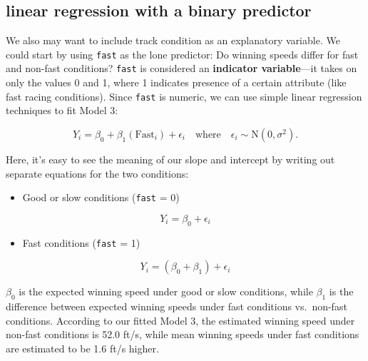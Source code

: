 \documentclass[
]{krantz}
\providecommand{\tightlist}{%
  \setlength{\itemsep}{0pt}\setlength{\parskip}{0pt}}
\begin{document}
\hypertarget{linear-regression-with-a-binary-predictor}{%
\subsection{linear regression with a binary predictor}\label{linear-regression-with-a-binary-predictor}}

We also may want to include track condition as an explanatory variable. We could start by using \texttt{fast} as the lone predictor: Do winning speeds differ for fast and non-fast conditions? \texttt{fast} is considered an \textbf{indicator variable}---it takes on only the values 0 and 1, where 1 indicates presence of a certain attribute (like fast racing conditions). Since \texttt{fast} is numeric, we can use simple linear regression techniques to fit Model 3:

\begin{equation}
Y_{i}=\beta_{0}+\beta_{1}(\textrm{Fast}_{i})+\epsilon_{i}\quad \textrm{where}\quad \epsilon_{i}\sim \textrm{N}(0,\sigma^2).
\label{eq:model3}
\end{equation}

Here, it's easy to see the meaning of our slope and intercept by writing out separate equations for the two conditions:

\begin{itemize}
\tightlist
\item
  Good or slow conditions (\texttt{fast} = 0)
\end{itemize}

\begin{equation}
Y_{i} = \beta_{0}+\epsilon_{i}
\end{equation}

\begin{itemize}
\tightlist
\item
  Fast conditions (\texttt{fast} = 1)
\end{itemize}

\begin{equation}
Y_{i} = (\beta_{0}+\beta_{1})+\epsilon_{i}
\end{equation}

\(\beta_{0}\) is the expected winning speed under good or slow conditions, while \(\beta_{1}\) is the difference between expected winning speeds under fast conditions vs.~non-fast conditions. According to our fitted Model 3, the estimated winning speed under non-fast conditions is 52.0 ft/s, while mean winning speeds under fast conditions are estimated to be 1.6 ft/s higher.
\end{document}
